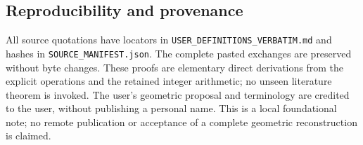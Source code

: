 \subsection{Reproducibility and
provenance}\label{uad-reproducibility-and-provenance}

All source quotations have locators in \nolinkurl{USER_DEFINITIONS_VERBATIM.md}
and hashes in \nolinkurl{SOURCE_MANIFEST.json}. The complete pasted exchanges are
preserved without byte changes. These proofs are elementary direct
derivations from the explicit operations and the retained integer
arithmetic; no unseen literature theorem is invoked. The user's
geometric proposal and terminology are credited to the user, without
publishing a personal name. This is a local foundational note; no remote
publication or acceptance of a complete geometric reconstruction is
claimed.
